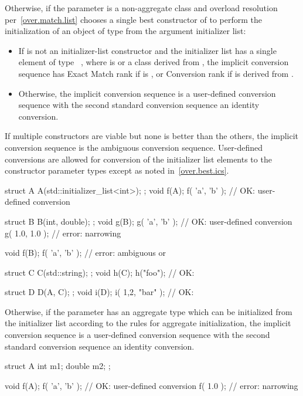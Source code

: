 \pnum
Otherwise, if the parameter is a non-aggregate class  and overload
resolution per~\ref{over.match.list} chooses a single best constructor  of
 to perform the initialization of an object of type  from the
argument initializer list:
\begin{itemize}
\item
If  is not an initializer-list constructor
and the initializer list has a single element of type \cv{}~,
where  is  or a class derived from ,
the implicit conversion sequence has Exact Match rank if  is ,
or Conversion rank if  is derived from .
\item
Otherwise, the implicit conversion sequence is a user-defined
conversion sequence with the second standard conversion sequence an
identity conversion.
\end{itemize}
If multiple constructors are viable but none is better than
the others, the implicit conversion sequence is the ambiguous conversion
sequence. User-defined conversions are allowed for conversion of the initializer
list elements to the constructor parameter types except as noted
in~\ref{over.best.ics}.
\begin{example}
\begin{codeblock}
struct A {
  A(std::initializer_list<int>);
};
void f(A);
f( {'a', 'b'} );        // OK:  user-defined conversion

struct B {
  B(int, double);
};
void g(B);
g( {'a', 'b'} );        // OK:  user-defined conversion
g( {1.0, 1.0} );        // error: narrowing

void f(B);
f( {'a', 'b'} );        // error: ambiguous  or 

struct C {
  C(std::string);
};
void h(C);
h({"foo"});             // OK: 

struct D {
  D(A, C);
};
void i(D);
i({ {1,2}, {"bar"} });  // OK: 
\end{codeblock}
\end{example}

\pnum
Otherwise, if the parameter has an aggregate type which can be initialized from
the initializer list according to the rules for aggregate
initialization, the implicit conversion sequence is a
user-defined conversion sequence with the second standard conversion
sequence an identity conversion.
\begin{example}
\begin{codeblock}
struct A {
  int m1;
  double m2;
};

void f(A);
f( {'a', 'b'} );        // OK:  user-defined conversion
f( {1.0} );             // error: narrowing
\end{codeblock}
\end{example}

